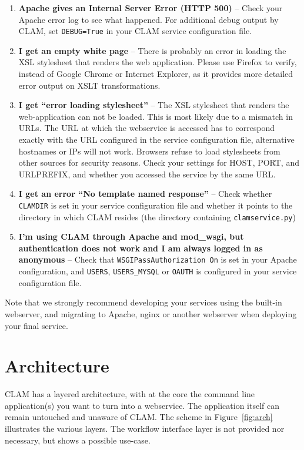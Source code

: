 \documentclass[a4paper,12pt,twoside,openright]{report}
\begin{document}
\begin{enumerate}[leftmargin=5mm]
\item \textbf{Apache gives an Internal Server Error (HTTP 500)} -- Check your Apache error log to see what happened. For additional debug output by CLAM, set \texttt{DEBUG=True} in your CLAM service configuration file. 
\item \textbf{I get an empty white page} -- There is probably an error in loading the XSL stylesheet that renders the web application. Please use Firefox to verify, instead of Google Chrome or Internet Explorer, as it provides more detailed error output on XSLT transformations.
\item \textbf{I get ``error loading stylesheet''} -- The XSL stylesheet that
  renders the web-application can not be loaded. This is most likely due to a
  mismatch in URLs. The URL at which the webservice is accessed has to
  correspond exactly with the URL configured in the service configuration file,
  alternative hostnames or IPs will not work. Browsers refuse to load
  stylesheets from other sources for security reasons. Check your settings for HOST, PORT,  and URLPREFIX, and whether you accessed the service by the same URL.
\item \textbf{I get an error ``No template named response''} -- Check whether
  \texttt{CLAMDIR} is set in your service configuration file and whether it points to the directory in which CLAM resides (the directory containing \texttt{clamservice.py})
\item \textbf{I'm using CLAM through Apache and mod\_wsgi, but authentication does
  not work and I am always logged in as anonymous} -- Check that
  \texttt{WSGIPassAuthorization On} is set in your Apache configuration, and
  \texttt{USERS}, \texttt{USERS\_MYSQL} or \texttt{OAUTH} is configured in your service configuration file.

\end{enumerate}

Note that we strongly recommend developing your services using the built-in
webserver, and migrating to Apache, nginx or another webserver when deploying
your final service.

\section{Architecture}

CLAM has a layered architecture, with at the core the command line
application(s) you want to turn into a webservice. The application itself can
remain untouched and unaware of CLAM. The scheme in Figure~\ref{fig:arch}
illustrates the various layers.  The workflow interface layer is not provided
nor necessary, but shows a possible use-case.
\end{document}

